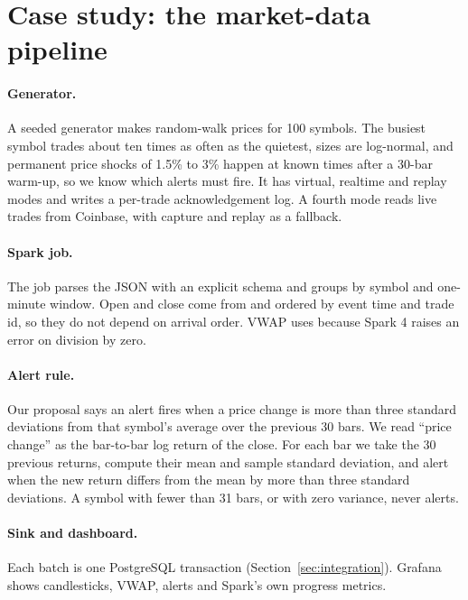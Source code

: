\section{Case study: the market-data pipeline}
\paragraph{Generator.} A seeded generator makes random-walk prices for 100 symbols. The busiest symbol
trades about ten times as often as the quietest, sizes are log-normal, and permanent price shocks of
1.5\% to 3\% happen at known times after a 30-bar warm-up, so we know which alerts must fire. It has
virtual, realtime and replay modes and writes a per-trade acknowledgement log. A fourth mode reads live
trades from Coinbase, with capture and replay as a fallback.

\paragraph{Spark job.} The job parses the JSON with an explicit schema and groups by symbol and
one-minute window. Open and close come from  and  ordered by event time and
trade id, so they do not depend on arrival order. VWAP uses  because Spark 4 raises an
error on division by zero.

\paragraph{Alert rule.} Our proposal says an alert fires when a price change is more than three
standard deviations from that symbol's average over the previous 30 bars. We read ``price change'' as
the bar-to-bar log return of the close. For each bar we take the 30 previous returns, compute their
mean and sample standard deviation, and alert when the new return differs from the mean by more than
three standard deviations. A symbol with fewer than 31 bars, or with zero variance, never alerts.

\paragraph{Sink and dashboard.} Each batch is one PostgreSQL transaction (Section~\ref{sec:integration}).
Grafana shows candlesticks, VWAP, alerts and Spark's own progress metrics.

